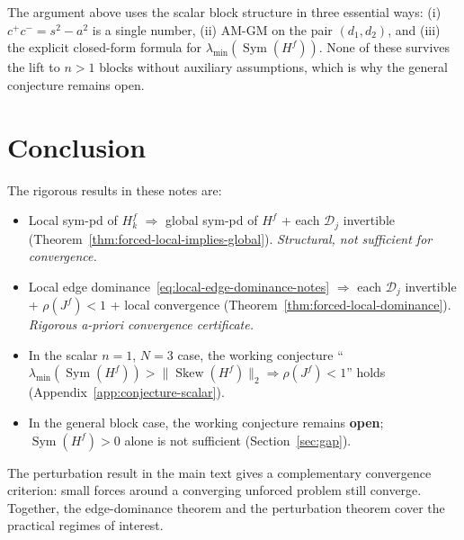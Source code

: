 \documentclass{article}
\newcommand{\Sym}{\operatorname{Sym}}
\newcommand{\Skew}{\operatorname{Skew}}
\begin{document}
\medskip
The argument above uses the scalar block structure in three essential ways:
(i) $c^+ c^- = s^2 - a^2$ is a single number, (ii) AM-GM on the pair
$(d_1, d_2)$, and (iii) the explicit closed-form formula for
$\lambda_{\min}(\Sym(H^f))$. None of these survives the lift to $n > 1$ blocks
without auxiliary assumptions, which is why the general conjecture remains open.

\section{Conclusion}

The rigorous results in these notes are:
\begin{itemize}
    \item Local sym-pd of $H_k^f$ $\Rightarrow$ global sym-pd of $H^f$ + each $\mathcal{D}_j$ invertible
          (Theorem~\ref{thm:forced-local-implies-global}). \emph{Structural, not sufficient for convergence.}
    \item Local edge dominance~\eqref{eq:local-edge-dominance-notes} $\Rightarrow$ each $\mathcal{D}_j$
          invertible + $\rho(J^f) < 1$ + local convergence
          (Theorem~\ref{thm:forced-local-dominance}). \emph{Rigorous a-priori convergence certificate.}
    \item In the scalar $n=1$, $N=3$ case, the working conjecture
          ``$\lambda_{\min}(\Sym(H^f)) > \|\Skew(H^f)\|_2 \Rightarrow \rho(J^f) < 1$''
          holds (Appendix~\ref{app:conjecture-scalar}).
    \item In the general block case, the working conjecture remains \textbf{open};
          $\Sym(H^f) > 0$ alone is not sufficient (Section~\ref{sec:gap}).
\end{itemize}

The perturbation result in the main text gives a complementary convergence
criterion: small forces around a converging unforced problem still converge.
Together, the edge-dominance theorem and the perturbation theorem cover the
practical regimes of interest.
\end{document}
